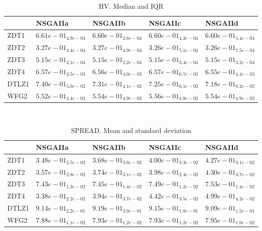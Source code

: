 \documentclass{article}
\begin{document}
\begin{table}
\caption{HV. Median and IQR}
\label{table:median.HV}
\begin{scriptsize}
\centering
\begin{tabular}{lllll}
\hline & NSGAIIa & NSGAIIb & NSGAIIc &  NSGAIId\\
\hline
ZDT1 & \cellcolor{gray95}$  6.61e-01_{ 4.9e-04}$ & \cellcolor{gray25}$  6.60e-01_{ 2.8e-04}$ & $  6.60e-01_{ 4.3e-04}$ & $  6.60e-01_{ 5.4e-04}$ \\
ZDT2 & \cellcolor{gray95}$  3.27e-01_{ 4.4e-04}$ & \cellcolor{gray25}$  3.27e-01_{ 4.9e-04}$ & $  3.26e-01_{ 5.1e-04}$ & $  3.26e-01_{ 7.5e-04}$ \\
ZDT3 & \cellcolor{gray95}$  5.15e-01_{ 2.1e-04}$ & \cellcolor{gray25}$  5.15e-01_{ 2.2e-04}$ & $  5.15e-01_{ 3.4e-04}$ & $  5.15e-01_{ 3.2e-04}$ \\
ZDT4 & \cellcolor{gray25}$  6.57e-01_{ 3.5e-03}$ & $  6.56e-01_{ 4.0e-03}$ & \cellcolor{gray95}$  6.57e-01_{ 6.7e-03}$ & $  6.55e-01_{ 4.4e-03}$ \\
DTLZ1 & \cellcolor{gray95}$  7.40e-01_{ 5.0e-02}$ & \cellcolor{gray25}$  7.31e-01_{ 4.1e-02}$ & $  7.25e-01_{ 6.1e-02}$ & $  7.18e-01_{ 8.2e-02}$ \\
WFG2 & $  5.52e-01_{ 4.4e-03}$ & \cellcolor{gray25}$  5.54e-01_{ 4.9e-03}$ & \cellcolor{gray95}$  5.56e-01_{ 4.8e-03}$ & $  5.54e-01_{ 4.9e-03}$ \\
\hline
\end{tabular}
\end{scriptsize}
\end{table}
\
\begin{table}
\caption{SPREAD. Mean and standard deviation}
\label{table:mean.SPREAD}
\centering
\begin{scriptsize}
\begin{tabular}{lllll}
\hline & NSGAIIa & NSGAIIb & NSGAIIc &  NSGAIId\\
\hline
ZDT1 & \cellcolor{gray95}$  3.48e-01_{ 2.5e-02}$ & \cellcolor{gray25}$  3.68e-01_{ 3.6e-02}$ & $  4.00e-01_{ 3.3e-02}$ & $  4.27e-01_{ 3.1e-02}$ \\
ZDT2 & \cellcolor{gray95}$  3.57e-01_{ 2.8e-02}$ & \cellcolor{gray25}$  3.74e-01_{ 3.1e-02}$ & $  3.98e-01_{ 2.4e-02}$ & $  4.30e-01_{ 3.7e-02}$ \\
ZDT3 & \cellcolor{gray95}$  7.43e-01_{ 1.2e-02}$ & \cellcolor{gray25}$  7.45e-01_{ 1.4e-02}$ & $  7.49e-01_{ 1.2e-02}$ & $  7.53e-01_{ 1.4e-02}$ \\
ZDT4 & \cellcolor{gray95}$  3.38e-01_{ 2.2e-02}$ & \cellcolor{gray25}$  3.94e-01_{ 3.7e-02}$ & $  4.42e-01_{ 3.5e-02}$ & $  4.99e-01_{ 4.2e-02}$ \\
DTLZ1 & \cellcolor{gray25}$  9.14e-01_{ 2.2e-01}$ & $  9.19e-01_{ 2.0e-01}$ & $  9.15e-01_{ 1.8e-01}$ & \cellcolor{gray95}$  9.09e-01_{ 1.5e-01}$ \\
WFG2 & \cellcolor{gray95}$  7.88e-01_{ 1.1e-02}$ & \cellcolor{gray25}$  7.93e-01_{ 1.2e-02}$ & $  7.93e-01_{ 1.2e-02}$ & $  7.95e-01_{ 1.0e-02}$ \\
\hline
\end{tabular}
\end{scriptsize}
\end{table}
\end{document}
